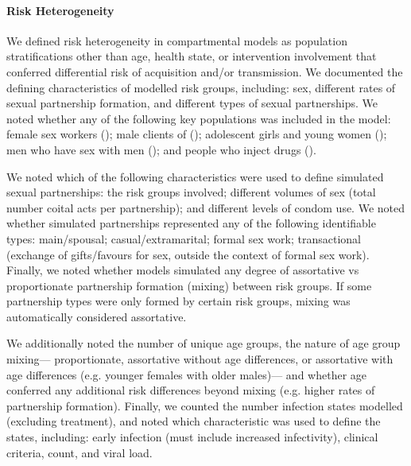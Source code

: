 \paragraph{Risk Heterogeneity}
We defined risk heterogeneity in compartmental models
as population stratifications other than age, health state, or intervention involvement
that conferred differential risk of \hiv acquisition and/or transmission. %
We documented the defining characteristics of modelled risk groups, including:
sex, %
different rates of sexual partnership formation, and different types of sexual partnerships. %
We noted whether any of the following key populations was included in the model: %
female sex workers (\fsw);
male clients of \fsw (\cli);
adolescent girls and young women (\agyw); %
men who have sex with men (\msm);  %
and people who inject drugs (\pwid).
\par
We noted which of the following characteristics were used to define  %
simulated sexual partnerships:
the risk groups involved;
different volumes of sex (total number coital acts per partnership); and
different levels of condom use.
We noted whether simulated partnerships represented
any of the following identifiable types:
main/spousal;
casual/extramarital;  %
formal sex work; %
transactional (exchange of gifts/favours for sex,
outside the context of formal sex work). %
Finally, we noted whether models simulated any degree of assortative vs proportionate %
partnership formation (mixing) between risk groups.
If some partnership types were only formed by certain risk groups,
mixing was automatically considered assortative.
\par
We additionally noted the number of unique age groups, the nature of age group mixing---%
proportionate, assortative without age differences, or assortative with age differences
(e.g. younger females with older males)---%
and whether age conferred any additional risk differences beyond mixing
(e.g. higher rates of partnership formation).
Finally, we counted the number \hiv infection states modelled (excluding treatment),
and noted which characteristic was used to define the states, including:
early infection (must include increased infectivity),
\who clinical criteria, \cdf count, and viral load.
